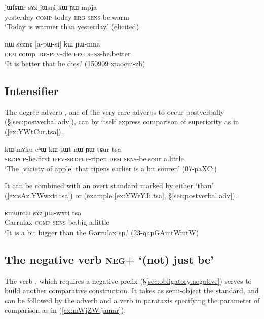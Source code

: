   
\begin{exe}
\ex \label{ex:comparative2}
\gll  jɯfɕɯr sɤz jɯsŋi kɯ ɲɯ-mpja \\
yesterday \textsc{comp} today \textsc{erg} \textsc{sens}-be.warm \\
\glt `Today is warmer than yesterday.' (elicited)
\end{exe}

\begin{exe}
\ex \label{ex:apWsi.kW}
\gll nɯ sɤznɤ [a-pɯ-si] kɯ ɲɯ-mna \\
\textsc{dem} comp \textsc{irr}-\textsc{pfv}-die \textsc{erg} \textsc{sens}-be.better \\
\glt `It is better that he dies.' (150909 xiaocui-zh)
\end{exe}

\subsection{Intensifier    } \label{sec:comparative.tsa}
The degree adverb , one of the very rare adverbs to occur postverbally (§\ref{sec:postverbal.adv}), can by itself express comparison of superiority as in (\ref{ex:YWtCur.tsa}).

\begin{exe}
\ex \label{ex:YWtCur.tsa}
\gll  kɯ-mɤku cʰɯ-kɯ-tɯt nɯ ɲɯ-tɕur tsa \\
\textsc{sbj}:\textsc{pcp}-be.first \textsc{ipfv}-\textsc{sbj}:\textsc{pcp}-ripen \textsc{dem} \textsc{sens}-be.sour a.little\\
\glt `The [variety of apple] that ripens earlier is a bit sourer.' (07-paXCi)
\end{exe}

It can be combined with an overt standard marked by either  `than' (\ref{ex:sAz.YWwxti.tsa}) or  (example \ref{ex:YWrYJi.tsa}, §\ref{sec:postverbal.adv}).

\begin{exe}
\ex \label{ex:sAz.YWwxti.tsa}
\gll  ʁmɯrcɯ sɤz ɲɯ-wxti tsa \\
Garrulax \textsc{comp} \textsc{sens}-be.big a.little \\
\glt `It is a bit bigger than the Garrulax sp.' (23-qapGAmtWmtW)
\end{exe}

\subsection{The negative verb \textsc{neg}+ `(not) just be'} \label{sec:mAZW}
 
The verb , which requires a negative prefix (§\ref{sec:obligatory.negative}) serves to build another comparative construction. It takes as semi-object the standard, and can be followed by the adverb  and a verb in parataxis specifying the parameter of comparison as in (\ref{ex:mWjZW.jamar}).

